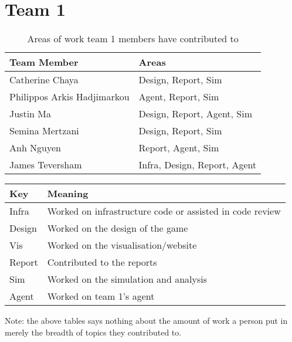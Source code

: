 \section{Team 1}
\label{sec:roles_appendix:team5}

\begin{table}[!h]
    \centering
    \begin{tabular}{|l|l|}
    \hline
    \textbf{Team Member} & \textbf{Areas}     \\ \hline
    Catherine Chaya  & Design, Report, Sim         \\
    Philippos Arkis Hadjimarkou  & Agent, Report, Sim                 \\
    Justin Ma     & Design, Report, Agent, Sim        \\
    Semina Mertzani     & Design, Report, Sim \\
    Anh Nguyen    & Report, Agent, Sim                      \\
    James Teversham  & Infra, Design, Report, Agent                        \\
\end{tabular}
\caption{Areas of work team 1 members have contributed to}
\label{sec:roles_appendix:team1}
\end{table}

\begin{table}[!h]
    \centering
    \begin{tabular}{|l|l|}
    \hline
    \textbf{Key}    & \textbf{Meaning}                               \\ \hline
    Infra  & Worked on infrastructure code or assisted in code review \\
    Design & Worked on the design of the game                         \\
    Vis    & Worked on the visualisation/website                      \\
    Report & Contributed to the reports                               \\
    Sim    & Worked on the simulation and analysis                    \\
    Agent  & Worked on team 1's agent                                 \\ \hline
    \end{tabular}
    \end{table}

Note: the above tables says nothing about the amount of work a person put in merely the breadth of topics they contributed to.
